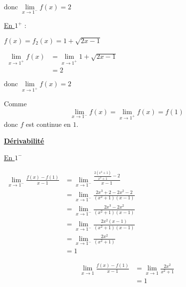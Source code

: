 \documentclass[12pt,a4paper]{article}
\begin{document}
\begin{enumerate}
          \( \text{donc } \lim\limits_{x \to 1^-} f(x) = 2 \)

          \bigskip

          \underline{En \( 1^+ \)} :

          \( f(x) = f_2(x) = 1 + \sqrt{2x -1} \)

          \( \begin{aligned}
              \lim\limits_{x \to 1^+} f(x) & = \lim\limits_{x \to 1^+} 1 + \sqrt{2x -1} \\
                                           & = 2
          \end{aligned} \)

          \(  \text{donc } \lim\limits_{x \to 1^+} f(x) = 2 \)

          Comme
          \[
              \lim\limits_{x \to 1^-} f(x) = \lim\limits_{x \to 1^+} f(x) = f(1)
          \]
          donc \( f \) est continue en \( 1 \).

          \bigskip

          \underline{\textbf{Dérivabilité}}

          \underline{En \( 1^- \)}

          \(
          \begin{aligned}
              \lim\limits_{x \to 1^-} \frac{f(x) - f(1)}{x - 1} & = \lim\limits_{x \to 1^-} \frac{\frac{2(x^3+1)}{x^2+1} -2}{x-1}   \\
                                                                & = \lim\limits_{x \to 1^-} \frac{2x^3 +2 - 2x^2 - 2}{(x^2+1)(x-1)} \\
                                                                & = \lim\limits_{x \to 1^-} \frac{2x^3 - 2x^2}{(x^2+1)(x-1)}        \\
                                                                & = \lim\limits_{x \to 1^-} \frac{2x^2 (x-1)}{(x^2+1)(x-1)}         \\
                                                                & = \lim\limits_{x \to 1^-} \frac{2x^2}{(x^2+1)}                    \\
                                                                & = 1
          \end{aligned}
          \)

          \[
              \begin{aligned}
                  \lim_{x \to 1} \frac{f(x) - f(1)}{x - 1} & = \lim_{x \to 1} \frac{2x^2}{x^2 + 1} \\
                                                           & = 1
              \end{aligned}
          \]


\end{enumerate}
\end{document}

